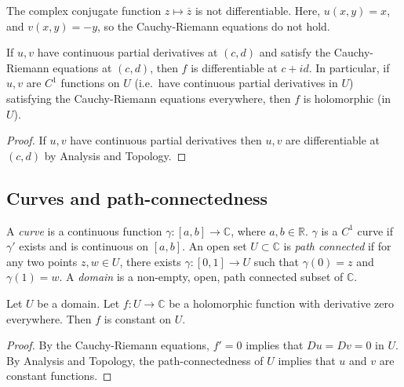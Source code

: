\begin{example}
	The complex conjugate function \( z \mapsto \overline z \) is not differentiable.
	Here, \( u(x,y) = x \), and \( v(x,y) = -y \), so the Cauchy-Riemann equations do not hold.
\end{example}
\begin{corollary}
	If \( u, v \) have continuous partial derivatives at \( (c,d) \) and satisfy the Cauchy-Riemann equations at \( (c,d) \), then \( f \) is differentiable at \( c + id \).
	In particular, if \( u,v \) are \( C^1 \) functions on \( U \) (i.e.\ have continuous partial derivatives in \( U \)) satisfying the Cauchy-Riemann equations everywhere, then \( f \) is holomorphic (in \( U \)).
\end{corollary}
\begin{proof}
	If \( u,v \) have continuous partial derivatives then \( u, v \) are differentiable at \( (c,d) \) by Analysis and Topology.
\end{proof}

\subsection{Curves and path-connectedness}
\begin{definition}
	A \textit{curve} is a continuous function \( \gamma \colon [a,b] \to \mathbb C \), where \( a,b \in \mathbb R \).
	\( \gamma \) is a \( C^1 \) curve if \( \gamma' \) exists and is continuous on \( [a,b] \).
	An open set \( U \subset \mathbb C \) is \textit{path connected} if for any two points \( z,w \in U \), there exists \( \gamma \colon [0,1] \to U \) such that \( \gamma(0) = z \) and \( \gamma(1) = w \).
	A \textit{domain} is a non-empty, open, path connected subset of \( \mathbb C \).
\end{definition}
\begin{corollary}
	Let \( U \) be a domain.
	Let \( f \colon U \to \mathbb C \) be a holomorphic function with derivative zero everywhere.
	Then \( f \) is constant on \( U \).
\end{corollary}
\begin{proof}
	By the Cauchy-Riemann equations, \( f' = 0 \) implies that \( Du = Dv = 0 \) in \( U \).
	By Analysis and Topology, the path-connectedness of \( U \) implies that \( u \) and \( v \) are constant functions.
\end{proof}

